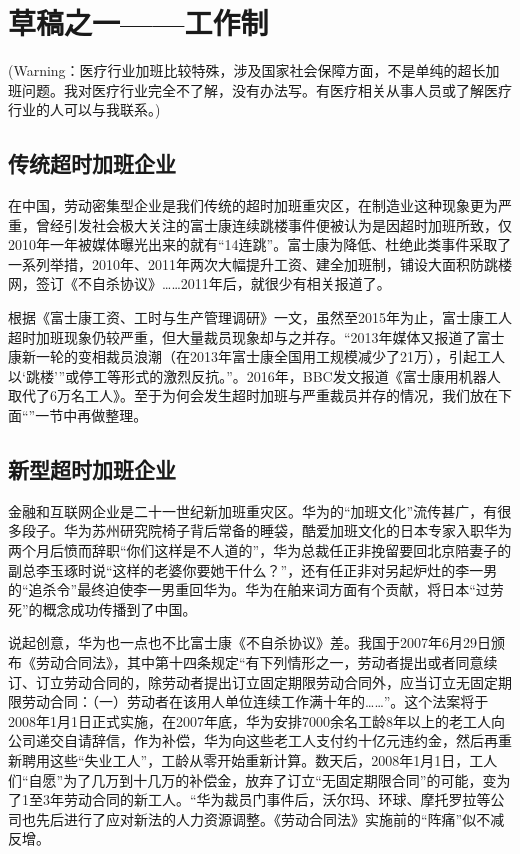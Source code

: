 \chapter{草稿之一——工作制}

(Warning：医疗行业加班比较特殊，涉及国家社会保障方面，不是单纯的超长加班问题。我对医疗行业完全不了解，没有办法写。有医疗相关从事人员或了解医疗行业的人可以与我联系。)

\section{传统超时加班企业}

在中国，劳动密集型企业是我们传统的超时加班重灾区，在制造业这种现象更为严重\cite{guojilaogongshijian}，曾经引发社会极大关注的富士康连续跳楼事件便被认为是因超时加班所致，仅2010年一年被媒体曝光出来的就有“14连跳”。富士康为降低、杜绝此类事件采取了一系列举措，2010年、2011年两次大幅提升工资、建全加班制，铺设大面积防跳楼网，签订《不自杀协议》……2011年后，就很少有相关报道了。

根据《富士康工资、工时与生产管理调研》\cite{fushikangzuixin}一文，虽然至2015年为止，富士康工人超时加班现象仍较严重，但大量裁员现象却与之并存。“2013年媒体又报道了富士康新一轮的变相裁员浪潮（在2013年富士康全国用工规模减少了21万），引起工人以`跳楼'”或停工等形式的激烈反抗。”。2016年，BBC发文报道《富士康用机器人取代了6万名工人》。至于为何会发生超时加班与严重裁员并存的情况，我们放在下面“”一节中再做整理。

\section{新型超时加班企业}

金融和互联网企业是二十一世纪新加班重灾区。华为的“加班文化”流传甚广，有很多段子。华为苏州研究院椅子背后常备的睡袋，酷爱加班文化的日本专家入职华为两个月后愤而辞职“你们这样是不人道的”，华为总裁任正非挽留要回北京陪妻子的副总李玉琢时说“这样的老婆你要她干什么？”，还有任正非对另起炉灶的李一男的“追杀令”最终迫使李一男重回华为。华为在舶来词方面有个贡献，将日本“过劳死”的概念成功传播到了中国。

说起创意，华为也一点也不比富士康《不自杀协议》差。我国于2007年6月29日颁布《劳动合同法》，其中第十四条规定“有下列情形之一，劳动者提出或者同意续订、订立劳动合同的，除劳动者提出订立固定期限劳动合同外，应当订立无固定期限劳动合同：（一）劳动者在该用人单位连续工作满十年的……”。这个法案将于2008年1月1日正式实施，在2007年底，华为安排7000余名工龄8年以上的老工人向公司递交自请辞信，作为补偿，华为向这些老工人支付约十亿元违约金，然后再重新聘用这些“失业工人”，工龄从零开始重新计算。数天后，2008年1月1日，工人们“自愿”为了几万到十几万的补偿金，放弃了订立“无固定期限合同”的可能，变为了1至3年劳动合同的新工人。“华为裁员门事件后，沃尔玛、环球、摩托罗拉等公司也先后进行了应对新法的人力资源调整。《劳动合同法》实施前的“阵痛”似不减反增。\cite{huaweimaiduan}

